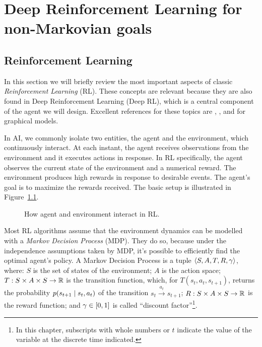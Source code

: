\chapter{Deep Reinforcement Learning for non-Markovian goals}

\section{Reinforcement Learning}

In this section we will briefly review the most important aspects of classic
\emph{Reinforcement Learning} (RL). These concepts are relevant because they
are also found in Deep Reinforcement Learning (Deep RL), which is a central
component of the agent we will design. Excellent references for these topics
are \cite{bib:rl-book}, \cite{bib:probabilistic-rl}, and
\cite{bib:ml-book-murphy} for graphical models.

In AI, we commonly isolate two entities, the agent and the environment, which
continuously interact. At each instant, the agent receives observations from
the environment and it executes actions in response. In RL specifically, the
agent observes the current state of the environment and a numerical reward.
The environment produces high rewards in response to desirable events. The
agent's goal is to maximize the rewards received. The basic setup is
illustrated in Figure~\ref{fig:rl}.

\begin{figure}
	\centering
	\caption{How agent and environment interact in RL.}
	\label{fig:rl}
\end{figure}

Most RL algorithms assume that the environment dynamics can be modelled with a
\emph{Markov Decision Process} (MDP). They do so, because under the
independence assumptions taken by MDP, it's possible to efficiently find
the optimal agent's policy. A Markov Decision Process is a tuple $\langle S,
A, T, R, \gamma \rangle$, where: $S$ is the set of states of the
environment; $A$ is the action space; $T: S \times A \times S \to \mathbb{R}$ is the
transition function, which, for ${T(s_{t}, a_{t}, s_{t+1})}$,
returns the probability $p(s_{t+1} \mid s_{t}, a_{t})$ of
the transition ${s_{t} \xrightarrow{a_{t}} s_{t+1}}$; $R: S
\times A \times S \to \mathbb{R}$ is the reward function; and $\gamma \in [0, 1]$
is called ``discount factor''\footnote{In this chapter, subscripts with whole
numbers or $t$ indicate the value of the variable at the discrete time
indicated.}.

